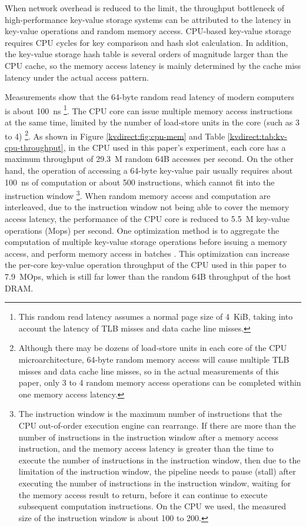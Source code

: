{{When network overhead is reduced to the limit, the throughput bottleneck of high-performance key-value storage systems can be attributed to the latency in key-value operations and random memory access. CPU-based key-value storage requires CPU cycles for key comparison and hash slot calculation. In addition, the key-value storage hash table is several orders of magnitude larger than the CPU cache, so the memory access latency is mainly determined by the cache miss latency under the actual access pattern.

Measurements show that the 64-byte random read latency of modern computers is about 100~ns \footnote{This random read latency assumes a normal page size of 4~KiB, taking into account the latency of TLB misses and data cache line misses.}. The CPU core can issue multiple memory access instructions at the same time, limited by the number of load-store units in the core (such as 3 to 4) \cite {gharachorloo1992hiding,han2010packetshader,zhang2015mega} \footnote{Although there may be dozens of load-store units in each core of the CPU microarchitecture, 64-byte random memory access will cause multiple TLB misses and data cache line misses, so in the actual measurements of this paper, only 3 to 4 random memory access operations can be completed within one memory access latency.}. As shown in Figure \ref{kvdirect:fig:cpu-mem} and Table \ref{kvdirect:tab:kv-cpu-throughput}, in the CPU used in this paper's experiment, each core has a maximum throughput of 29.3~M random 64B accesses per second. On the other hand, the operation of accessing a 64-byte key-value pair usually requires about 100~ns of computation or about 500 instructions, which cannot fit into the instruction window \footnote{The instruction window is the maximum number of instructions that the CPU out-of-order execution engine can rearrange. If there are more than the number of instructions in the instruction window after a memory access instruction, and the memory access latency is greater than the time to execute the number of instructions in the instruction window, then due to the limitation of the instruction window, the pipeline needs to pause (stall) after executing the number of instructions in the instruction window, waiting for the memory access result to return, before it can continue to execute subsequent computation instructions. On the CPU we used, the measured size of the instruction window is about 100 to 200.}. When random memory access and computation are interleaved, due to the instruction window not being able to cover the memory access latency, the performance of the CPU core is reduced to 5.5~M key-value operations (Mops) per second. One optimization method is to aggregate the computation of multiple key-value storage operations before issuing a memory access, and perform memory access in batches \cite {li2016full,narula2014phase}. This optimization can increase the per-core key-value operation throughput of the CPU used in this paper to 7.9~MOps, which is still far lower than the random 64B throughput of the host DRAM.

}}
